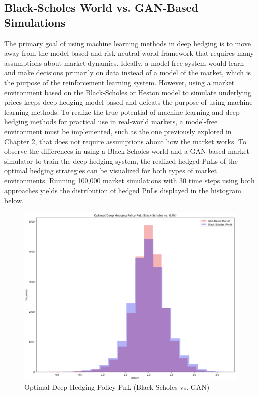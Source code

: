 \subsection{Black-Scholes World vs. GAN-Based Simulations}
The primary goal of using machine learning methods in deep hedging is to move away from the model-based and risk-neutral world framework that requires many assumptions about market dynamics. Ideally, a model-free system would learn and make decisions primarily on data instead of a model of the market, which is the purpose of the reinforcement learning system. However, using a market environment based on the Black-Scholes or Heston model to simulate underlying prices keeps deep hedging model-based and defeats the purpose of using machine learning methods. To realize the true potential of machine learning and deep hedging methods for practical use in real-world markets, a model-free environment must be implemented, such as the one previously explored in Chapter 2, that does not require assumptions about how the market works. To observe the differences in using a Black-Scholes world and a GAN-based market simulator to train the deep hedging system, the realized hedged PnLs of the optimal hedging strategies can be visualized for both types of market environments. Running 100,000 market simulations with 30 time steps using both approaches yields the distribution of hedged PnLs displayed in the histogram below.
\begin{figure}[h]
\centering
\includegraphics[width=14cm]{templates/assets/drl/hedge_pnl.png}
\caption{Optimal Deep Hedging Policy PnL (Black-Scholes vs. GAN)}
\end{figure}

